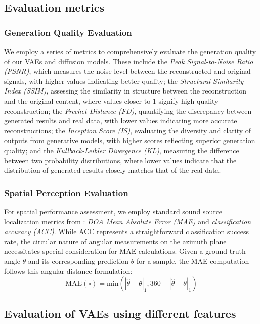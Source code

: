 \documentclass{IEEEtran}
\begin{document}
\subsection{Evaluation metrics}

\subsubsection{Generation Quality Evaluation}
\label{rqe}
We employ a series of metrics to comprehensively evaluate the generation quality of our VAEs and diffusion models. These include the \textit{Peak Signal-to-Noise Ratio (PSNR)}, which measures the noise level between the reconstructed and original signals, with higher values indicating better quality; the \textit{Structural Similarity Index (SSIM)}, assessing the similarity in structure between the reconstruction and the original content, where values closer to $1$ signify high-quality reconstruction; the  \textit{Frechet Distance (FD)}, quantifying the discrepancy between generated results and real data, with lower values indicating more accurate reconstructions; the \textit{Inception Score (IS)}, evaluating the diversity and clarity of outputs from generative models, with higher scores reflecting superior generation quality; and the \textit{Kullback-Leibler Divergence (KL)}, measuring the difference between two probability distributions, where lower values indicate that the distribution of generated results closely matches that of the real data.


\subsubsection{Spatial Perception Evaluation}
For spatial performance assessment, we employ standard sound source localization metrics from \cite{feng2025eliminating}: \textit{DOA Mean Absolute Error (MAE)} and \textit{classification accuracy (ACC)}. While ACC represents a straightforward classification success rate, the circular nature of angular measurements on the azimuth plane necessitates special consideration for MAE calculations. Given a ground-truth angle $\theta$ and its corresponding prediction $\hat{\theta}$ for a sample, the MAE computation follows this angular distance formulation:
\begin{equation}\label{eq:mae}
    \mathrm{MAE}(\circ)= \mathrm{min}(|\hat \theta - \theta|_1, 360-|\hat \theta - \theta|_1)
\end{equation}


\subsection{Evaluation of VAEs using different features}
\label{subsec: Evaluation of VAEs Using Different Features}
\end{document}
